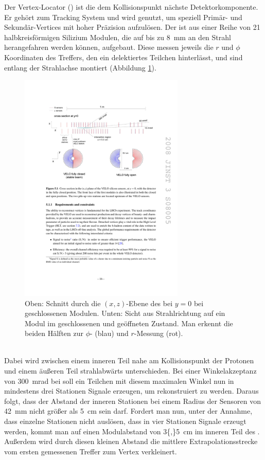 Der Vertex-Locator (\velo) ist die dem Kollisionspunkt nächste Detektorkomponente. Er gehört zum Tracking System und wird genutzt, um speziell Primär- und Sekundär-Vertices mit hoher Präzision aufzulösen. Der \velo ist aus einer Reihe von \num{21} halbkreisförmigen Silizium Modulen, die auf bis zu \SI{8}{mm} an den Strahl herangefahren werden können, aufgebaut. Diese messen jeweils die $r$ und $\phi$ Koordinaten des Treffers, den ein delektiertes Teilchen hinterlässt, und sind entlang der Strahlachse montiert (Abbildung \ref{fig:velo}).  
\begin{figure}[htpb]
	\centering
		\includegraphics[width=0.7\textwidth]{fig/velo.pdf}
	\caption{Oben: Schnitt durch die $(x,z)$-Ebene des \velo bei $y=0$ bei geschlossenen Modulen. Unten: Sicht aus Strahlrichtung auf ein Modul im geschlossenen und geöffneten Zustand. Man erkennt die beiden Hälften zur $\phi$- (blau) und $r$-Messung (rot). \cite{Alves:2008zz}}
	\label{fig:velo} 
\end{figure} \\
Dabei wird zwischen einem inneren Teil nahe am Kollisionspunkt der Protonen und einem äußeren Teil strahlabwärts unterschieden. Bei einer Winkelakzeptanz von \SI{300}{mrad} bei \lhcb soll ein Teilchen mit diesem maximalen Winkel nun in mindestens drei Stationen Signale erzeugen, um rekonstruiert zu werden. Daraus folgt, dass der Abstand der inneren Stationen bei einem Radius der Sensoren von \SI{42}{mm} nicht größer als \SI{5}{cm} sein darf. Fordert man nun, unter der Annahme, dass einzelne Stationen nicht auslösen, dass in vier Stationen Signale erzeugt werden, kommt man auf einen Modulabstand von \SI{3{,}5}{cm} im inneren Teil des \velo. Außerdem wird durch diesen kleinen Abstand die mittlere Extrapolationsstrecke vom ersten gemessenen Treffer zum Vertex verkleinert.\\
